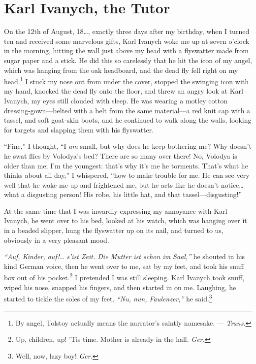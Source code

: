 
\chapter{Karl Ivanych, the Tutor} %

On the 12th of August, 18\ldots{}, exactly three days after my birthday, when I turned ten and received some marvelous gifts, Karl Ivanych woke me up at seven o'clock in the morning, hitting the wall just above my head with a flyswatter made from sugar paper and a stick. He did this so carelessly that he hit the icon of my angel, which was hanging from the oak headboard, and the dead fly fell right on my head.\footnote{By angel, Tolstoy actually means the narrator's saintly namesake. --- \textit{Trans.}} I stuck my nose out from under the cover, stopped the swinging icon with my hand, knocked the dead fly onto the floor, and threw an angry look at Karl Ivanych, my eyes still clouded with sleep. He was wearing a motley cotton dressing-gown---belted with a belt from the same material---a red knit cap with a tassel, and soft goat-skin boots, and he continued to walk along the walls, looking for targets and slapping them with his flyswatter.

``Fine,'' I thought, ``I \emph{am} small, but why does he keep bothering me? Why doesn't he swat flies by Volodya's bed? There are so many over there! No, Volodya is older than me; I'm the youngest: that's why it's me he torments. That's what he thinks about all day,'' I whispered, ``how to make trouble for me. He can see very well that he woke me up and frightened me, but he acts like he doesn't notice\ldots{} what a disgusting person! His robe, his little hat, and that tassel---disgusting!'' %

At the same time that I was inwardly expressing my annoyance with Karl Ivanych, he went over to his bed, looked at his watch, which was hanging over it in a beaded slipper, hung the flyswatter up on its nail, and turned to us, obviously in a very pleasant mood.

\textit{``Auf, Kinder, auf!\ldots{} s'ist Zeit. Die Mutter ist schon im Saal,''} he shouted in his kind German voice, then he went over to me, sat by my feet, and took his snuff box out of his pocket.\footnote{Up, children, up! 'Tis time. Mother is already in the hall. \textit{Ger.}} I pretended I was still sleeping. Karl Ivanych took snuff, wiped his nose, snapped his fingers, and then started in on me. Laughing, he started to tickle the soles of my feet. \textit{``Nu, nun, Faulenzer,''} he said.\footnote{Well, now, lazy boy! \textit{Ger.}} %

